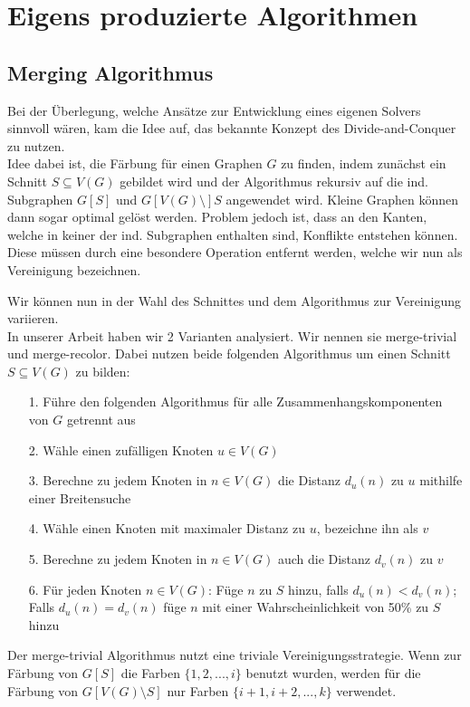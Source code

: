 \documentclass[11pt]{article}
\begin{document}
\section{Eigens produzierte Algorithmen} %
\subsection{Merging Algorithmus}
Bei der Überlegung, welche Ansätze zur Entwicklung eines eigenen Solvers sinnvoll wären,
kam die Idee auf, das bekannte Konzept des Divide-and-Conquer zu nutzen.\\
Idee dabei ist, die Färbung für einen Graphen $G$ zu finden, 
indem zunächst ein Schnitt $S\subseteq V(G)$ gebildet wird 
und der Algorithmus rekursiv auf die ind. Subgraphen 
$G[S]$ und $G[V(G)\setminus] S$ angewendet wird. 
Kleine Graphen können dann sogar optimal gelöst werden. 
Problem jedoch ist, dass an den Kanten, 
welche in keiner der ind. Subgraphen enthalten sind,
Konflikte entstehen können. Diese müssen durch eine besondere Operation entfernt werden, 
welche wir nun als Vereinigung bezeichnen.\par

Wir können nun in der Wahl des Schnittes und dem Algorithmus zur Vereinigung variieren.\\
In unserer Arbeit haben wir 2 Varianten analysiert. Wir nennen sie merge-trivial und merge-recolor.
Dabei nutzen beide folgenden Algorithmus um einen Schnitt $S\subseteq V(G)$ zu bilden:
\begin{itemize}
\item[1.] Führe den folgenden Algorithmus für alle Zusammenhangskomponenten von $G$ getrennt aus
\item[2.] Wähle einen zufälligen Knoten $u\in V(G)$
\item[3.] Berechne zu jedem Knoten in $n\in V(G)$ die Distanz $d_u(n)$ zu $u$ mithilfe einer Breitensuche
\item[4.] Wähle einen Knoten mit maximaler Distanz zu $u$, bezeichne ihn als $v$
\item[5.] Berechne zu jedem Knoten in $n\in V(G)$ auch die Distanz $d_v(n)$ zu $v$
\item[6.] Für jeden Knoten $n\in V(G)$: Füge $n$ zu $S$ hinzu, falls $d_u(n)<d_v(n)$; Falls $d_u(n)=d_v(n)$ füge $n$ mit einer Wahrscheinlichkeit von 50\% zu $S$ hinzu
\end{itemize}

Der merge-trivial Algorithmus nutzt eine triviale Vereinigungsstrategie. 
Wenn zur Färbung von $G[S]$ die Farben $\{1,2,...,i\}$ benutzt wurden, 
werden für die Färbung von $G[V(G)\setminus S]$ nur Farben $\{i+1,i+2,...,k\}$ verwendet.\\
\end{document}
